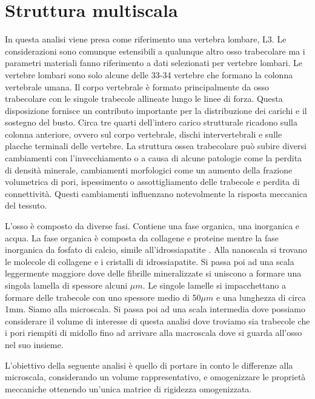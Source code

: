 \documentclass[a4paper,num-refs]{oup-contemporary}
\begin{document}
\section{Struttura multiscala}


In questa analisi viene presa come riferimento una vertebra lombare, L3. Le considerazioni sono comunque estensibili a qualunque altro osso trabecolare ma i parametri materiali fanno riferimento a dati selezionati per vertebre lombari.  
Le vertebre lombari sono solo alcune delle 33-34 vertebre che formano la colonna vertebrale umana. Il corpo vertebrale è formato principalmente da osso trabecolare con le singole trabecole allineate lungo le linee di forza. Questa disposizione fornisce un contributo importante per la distribuzione dei carichi e il sostegno del busto. Circa tre quarti dell'intero carico strutturale ricadono sulla colonna anteriore, ovvero sul corpo vertebrale, dischi intervertebrali e sulle placche terminali delle vertebre. La struttura ossea trabecolare può subire diversi cambiamenti con l'invecchiamento o a causa di alcune patologie \citep{Ferguson:2003} come la perdita di densità minerale, cambiamenti morfologici come un aumento della frazione volumetrica di pori, ispessimento o assottigliamento delle trabecole e perdita di connettività. Questi cambiamenti influenzano notevolmente la risposta meccanica del tessuto. 

L'osso è composto da diverse fasi. Contiene una fase organica, una inorganica e acqua. La fase organica è composta da collagene e proteine mentre la fase inorganica da fosfato di calcio, simile all'idrossiapatite \citep{Hamed:2012}. Alla nanoscala si trovano le molecole di collagene e i cristalli di idrossiapatite. Si passa poi ad una scala leggermente maggiore dove delle fibrille mineralizzate si uniscono a formare una singola lamella di spessore alcuni $\mu m$. Le singole lamelle si impacchettano a formare delle trabecole con uno spessore medio di 50$\mu m$ e una lunghezza di circa 1mm. Siamo alla microscala. Si passa poi ad una scala intermedia dove possiamo considerare il volume di interesse di questa analisi dove troviamo sia trabecole che i pori riempiti di midollo fino ad arrivare alla macroscala dove si guarda all'osso nel suo insieme. 

L'obiettivo della seguente analisi è quello di portare in conto le differenze alla microscala, considerando un volume rappresentativo, e omogenizzare le proprietà meccaniche ottenendo un'unica matrice di rigidezza omogenizzata.    
\end{document}
